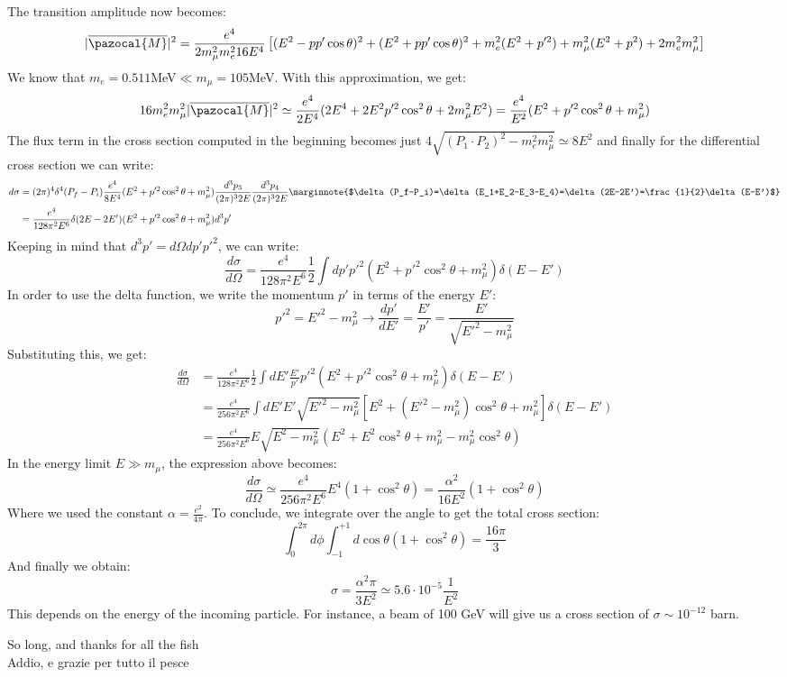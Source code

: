 \documentclass[../main.tex]{subfiles}
\begin{document}
The transition amplitude now becomes:
\[
|\overline{\pazocal{M}}|^2=\frac{e^4}{2m_\mu^2m_e^216E^4}\left[(E^2-pp'\cos\theta)^2+(E^2+pp'\cos\theta)^2+m_e^2(E^2+p'^2)+m_\mu^2(E^2+p^2)+2m_e^2m_\mu^2\right]
\]
We know that $m_e=0.511$MeV$\ll m_\mu=105$MeV. With this approximation, we get:
\[
16m_e^2m_\mu^2|\overline{\pazocal{M}}|^2\simeq\frac{e^4}{2E^4}(2E^4+2E^2p'^2\cos^2\theta+2m_\mu^2E^2)=\frac{e^4}{E^2}(E^2+p'^2\cos^2\theta+m_\mu^2)
\]
The flux term in the cross section computed in the beginning becomes just $4\sqrt{(P_1\cdot P_2)^2-m_e^2m_\mu^2}\simeq8E^2$ and finally for the differential cross section we can write:
\begin{align*}
d\sigma&=(2\pi)^4\delta^4(P_f-P_i)\frac{e^4}{8E^4}(E^2+p'^2\cos^2\theta+m_\mu^2)\frac{d^3p_3}{(2\pi)^32E}\frac{d^3p_4}{(2\pi)^32E}\marginnote{$\delta(P_f-P_i)=\delta(E_1+E_2-E_3-E_4)=\delta(2E-2E')=\frac{1}{2}\delta(E-E')$}\\
&=\frac{e^4}{128\pi^2E^6}\delta(2E-2E')(E^2+p'^2\cos^2\theta+m_\mu^2)d^3p'
\end{align*}
Keeping in mind that $d^3p'=d\Omega dp'p'^2$, we can write:
\[
\frac{d\sigma}{d\Omega}=\frac{e^4}{128\pi^2E^6}\frac{1}{2}\int dp'p'^2(E^2+p'^2\cos^2\theta+m_\mu^2)\delta(E-E')
\]
In order to use the delta function, we write the momentum $p'$ in terms of the energy $E'$:
\[
p'^2=E'^2-m_\mu^2\xrightarrow[]{}\frac{dp'}{dE'}=\frac{E'}{p'}=\frac{E'}{\sqrt{E'^2-m_\mu^2}}
\]
Substituting this, we get:
\begin{align*}
\frac{d\sigma}{d\Omega}&=\frac{e^4}{128\pi^2E^6}\frac{1}{2}\int dE'\frac{E'}{p'}p'^2(E^2+p'^2\cos^2\theta+m_\mu^2)\delta(E-E')\\
&=\frac{e^4}{256\pi^2E^6}\int dE'E'\sqrt{E'^2-m_\mu^2}[E^2+(E'^2-m_\mu^2)\cos^2\theta+m_\mu^2]\delta(E-E')\\
&=\frac{e^4}{256\pi^2E^6}E\sqrt{E^2-m_\mu^2}(E^2+E^2\cos^2\theta+m_\mu^2-m_\mu^2\cos^2\theta)
\end{align*}
In the energy limit $E\gg m_\mu$, the expression above becomes:
\[
\frac{d\sigma}{d\Omega}\simeq\frac{e^4}{256\pi^2E^6}E^4(1+\cos^2\theta)=\frac{\alpha^2}{16E^2}(1+\cos^2\theta)
\]
Where we used the constant $\alpha=\frac{e^2}{4\pi}$. To conclude, we integrate over the angle to get the total cross section:
\[
\int_0^{2\pi}d\phi\int_{-1}^{+1}d\cos\theta(1+\cos^2\theta)=\frac{16\pi}{3}
\]
And finally we obtain:
\[
\sigma=\frac{\alpha^2\pi}{3E^2}\simeq5.6\cdot10^{-5}\frac{1}{E^2}
\]
This depends on the energy of the incoming particle. For instance, a beam of 100 GeV will give us a cross section of $\sigma\sim10^{-12}$ barn.
\newline
\begin{center}
So long, and thanks for all the fish\\
Addio, e grazie per tutto il pesce
\end{center}
\end{document}
